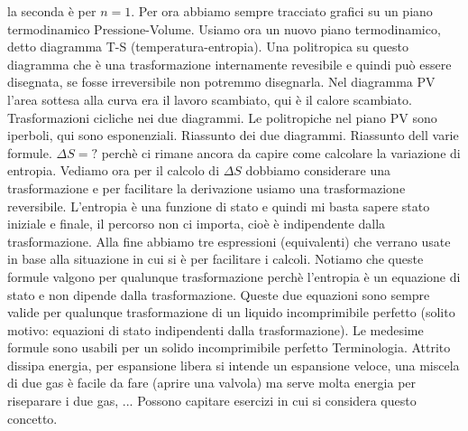 \newline[35] la seconda è per $n = 1$.
\newline[36] Per ora abbiamo sempre tracciato grafici su un piano termodinamico Pressione-Volume. Usiamo ora un nuovo piano termodinamico, detto diagramma T-S (temperatura-entropia). Una politropica su questo diagramma che è una trasformazione internamente revesibile e quindi può essere disegnata, se fosse irreversibile non potremmo disegnarla. Nel diagramma PV l'area sottesa alla curva era il lavoro scambiato, qui è il calore scambiato.
\newline[37] Trasformazioni cicliche nei due diagrammi.
\newline[38]  
\newline[39] Le politropiche nel piano PV sono iperboli, qui sono esponenziali.
\newline[40] Riassunto dei due diagrammi. 
\newline[41] Riassunto dell varie formule. $\Delta S = ?$ perchè ci rimane ancora da capire come calcolare la variazione di entropia.
\newline[42] Vediamo ora per il calcolo di $\Delta S$ dobbiamo considerare una trasformazione e per facilitare la derivazione usiamo una trasformazione reversibile. L'entropia è una funzione di stato e quindi mi basta sapere stato iniziale e finale, il percorso non ci importa, cioè è indipendente dalla trasformazione. 
\newline[43]  
\newline[44] Alla fine abbiamo tre espressioni (equivalenti) che verrano usate in base alla situazione in cui si è per facilitare i calcoli. Notiamo che queste formule valgono per qualunque trasformazione perchè l'entropia è un equazione di stato e non dipende dalla trasformazione.
\newline[45] Queste due equazioni sono sempre valide per qualunque trasformazione di un liquido incomprimibile perfetto (solito motivo: equazioni di stato indipendenti dalla trasformazione). Le medesime formule sono usabili per un solido incomprimibile perfetto 
\newline[46] Terminologia.
\newline[47] Attrito dissipa energia, per espansione libera si intende un espansione veloce, una miscela di due gas è facile da fare (aprire una valvola) ma serve molta energia per riseparare i due gas, ...
\newline[48] Possono capitare esercizi in cui si considera questo concetto.
